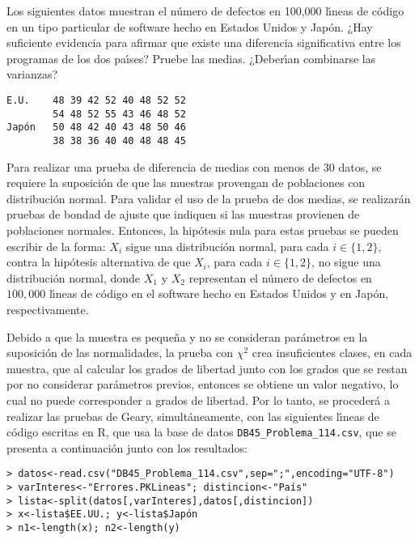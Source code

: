 \begin{enunciado}
 Los siguientes datos muestran el n\'umero de defectos en 100,000 l\'{\i}neas de c\'odigo en un tipo particular de software hecho en Estados Unidos y Jap\'on.
 ¿Hay suficiente evidencia para afirmar que existe una diferencia significativa entre los programas de los dos pa\'{\i}ses?
 Pruebe las medias.
 ¿Deber\'{\i}an combinarse las varianzas?
 \begin{verbatim}
E.U.    48 39 42 52 40 48 52 52
        54 48 52 55 43 46 48 52
Japón   50 48 42 40 43 48 50 46
        38 38 36 40 40 48 48 45
 \end{verbatim}
 \vspace{-0.5cm}
\end{enunciado}

\begin{solucion}
 Para realizar una prueba de diferencia de medias con menos de 30 datos,
 se requiere la suposici\'on de que las muestras provengan de poblaciones
 con distribuci\'on normal.
 Para validar el uso de la prueba de dos medias, se realizar\'an pruebas
 de bondad de ajuste que indiquen si las muestras provienen de poblaciones
 normales.
 Entonces, la hip\'otesis nula para estas pruebas se pueden
 escribir de la forma: $X_i$ sigue una distribuci\'on normal,
 para cada $i \in \{1,2\}$, contra la hip\'otesis alternativa
 de que $X_i$, para cada $i \in \{1,2\}$, no sigue una distribuci\'on
 normal, donde $X_1$ y $X_2$ representan el n\'umero de defectos
 en $100,000$ l\'{\i}neas de c\'odigo en el software hecho en Estados
 Unidos y en Jap\'on, respectivamente.
 \par 
 Debido a que la muestra es peque\~na y no se consideran par\'ametros
 en la suposici\'on de las normalidades,
 la prueba con $\chi^2$ crea insuficientes clases, en cada muestra,
 que al calcular los grados de libertad junto con los grados que se restan
 por no considerar par\'ametros previos, entonces se obtiene
 un valor negativo, lo cual no puede corresponder a grados de libertad.
 Por lo tanto, se proceder\'a a realizar las pruebas de Geary,
 simult\'aneamente, con las siguientes l\'{\i}neas de c\'odigo
 escritas en R, que usa la base de datos
 \texttt{DB45\_Problema\_114.csv},
 que se presenta a continuaci\'on junto con los resultados:
 \begin{verbatim}
> datos<-read.csv("DB45_Problema_114.csv",sep=";",encoding="UTF-8")
> varInteres<-"Errores.PKLineas"; distincion<-"País"
> lista<-split(datos[,varInteres],datos[,distincion])
> x<-lista$EE.UU.; y<-lista$Japón
> n1<-length(x); n2<-length(y)

\end{verbatim}
\end{solucion}
